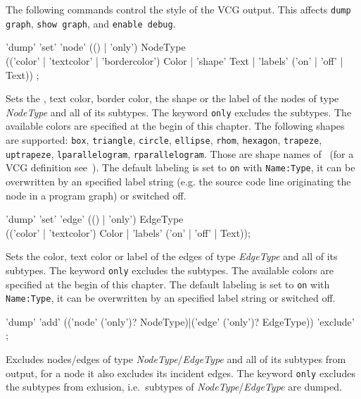 The following commands control the style of the VCG output. This affects \texttt{dump graph}, \texttt{show graph}, and \texttt{enable debug}. 
\begin{rail}
  'dump' 'set' 'node' (() | 'only') NodeType \\ (('color' | 'textcolor' | 'bordercolor') Color | 'shape' Text | 'labels' ('on' | 'off' | Text)) ;
\end{rail}
Sets the , text color, border color, the shape or the label of the nodes of type \emph{NodeType} and all of its subtypes.
The keyword \texttt{only} excludes the subtypes. The available colors are specified at the begin of this chapter. 
The following shapes are supported: \texttt{box}, \texttt{triangle}, \texttt{circle}, \texttt{ellipse}, \texttt{rhom}, \texttt{hexagon}, \texttt{trapeze}, \texttt{uptrapeze}, \texttt{lparallelogram}, \texttt{rparallelogram}.
Those are shape names of \yComp\ (for a VCG definition see~\cite{vcg}).
The default labeling is set to \texttt{on} with \texttt{Name:Type}, it can be overwritten by an specified label string (e.g. the source code line originating the node in a program graph) or switched off.

\begin{rail}
  'dump' 'set' 'edge' (() | 'only') EdgeType \\ (('color' | 'textcolor') Color | 'labels' ('on' | 'off' | Text));
\end{rail}
Sets the color, text color or label of the edges of type \emph{EdgeType} and all of its subtypes.
The keyword \texttt{only} excludes the subtypes. The available colors are specified at the begin of this chapter.
The default labeling is set to \texttt{on} with \texttt{Name:Type}, it can be overwritten by an specified label string or switched off.

\begin{rail}
  'dump' 'add' (('node' ('only')? NodeType)|('edge' ('only')? EdgeType)) 'exclude' ;
\end{rail}
Excludes nodes/edges of type \emph{NodeType}/\emph{EdgeType} and all of its subtypes from output, for a node it also excludes its incident edges.
The keyword \texttt{only} excludes the subtypes from exlusion, i.e.\ subtypes of \emph{NodeType}/\emph{EdgeType} are dumped.

